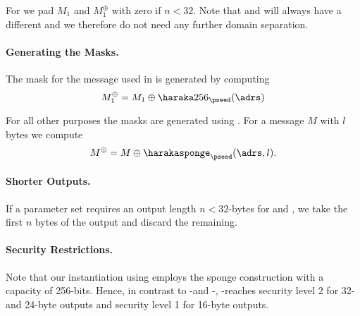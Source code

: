    For \sphincsF we pad $M_1$ and $M_1^{\oplus}$ with zero if $n < 32$.
   Note that \sphincsH 
   and \sphincsHmsg will always have a different \adrs and we therefore do not 
   need any further domain separation.

   \paragraph{Generating the Masks.} The mask for the message used in \sphincsF 
   is generated by computing
   \begin{equation}
      M_1^{\oplus} = M_1 \oplus \haraka256_{\pseed}(\adrs)
   \end{equation}

   For all other purposes the masks are generated using \harakasponge. For a 
   message $M$ with $l$ bytes we compute
   \begin{equation*}
      M^{\oplus} = M \oplus \harakasponge_{\pseed}(\adrs, l).
   \end{equation*}

   \paragraph{Shorter Outputs.} If a parameter set requires an 
   output length $n < 32$-bytes for \sphincsF and \sphincsPRF,
   we take the first $n$ bytes of the output and discard the remaining.

   \paragraph{Security Restrictions.} Note that our instantiation using \haraka 
   employs the sponge construction with a capacity of 256-bits. Hence, in 
   contrast to \spx-\shatwo and \spx-\shathree, \spx-\haraka reaches 
   security level 2 for 32- and 24-byte outputs and security level 1 for 
   16-byte outputs.
   
   



   
